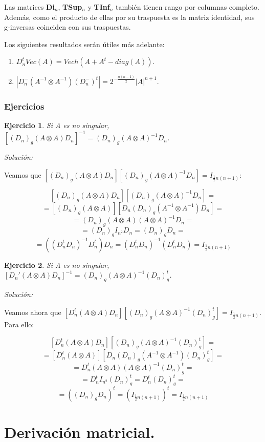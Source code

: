 \documentclass{article}
\theoremstyle{theorem-style}  %
\theoremstyle{definition-style}
\theoremstyle{example-style}
\theoremstyle{exercise-style}
\newtheorem{exercise}{Ejercicio}[section]
\begin{document}
	Las matrices \textbf{Di$_n$}, \textbf{TSup$_n$} y \textbf{TInf$_n$} también tienen rango por columnas completo. Además, como el producto de ellas por su traspuesta es la matriz identidad, sus g-inversas coinciden con sus traspuestas.
	
	Los siguientes resultados serán útiles más adelante:
	\begin{enumerate}
		\item $D_n^tVec(A) = Vech(A+A^t-diag(A))$.
		\item $|D_n^-(A^{-1}\otimes A^{-1})(D_n^-)^t| = 2^{-\frac{n(n-1)}{2}}|A|^{n+1}$.
	\end{enumerate}
	
	
	
	\subsubsection{Ejercicios}
	\begin{exercise}
		Si A es no singular, $[(D_n)_g(A\otimes A)D_n]^{-1} = (D_n)_g(A\otimes A)^{-1}D_n$.
	\end{exercise}
	
	\textit{Solución:}
	
	Veamos que $[(D_n)_g(A\otimes A)D_n][(D_n)_g(A\otimes A)^{-1}D_n] = I_{\frac{1}{2}n(n+1)}$:
	
	$$ [(D_n)_g(A\otimes A)D_n][(D_n)_g(A\otimes A)^{-1}D_n] = $$
	$$ = [(D_n)_g(A\otimes A)][D_n(D_n)_g(A^{-1}\otimes A^{-1})D_n] = $$
	$$ = (D_n)_g(A\otimes A)(A \otimes A)^{-1}D_n = $$
	$$ = (D_n)_g I_{n^2}D_n = (D_n)_g D_n = $$
	$$ = ((D_n^tD_n)^{-1}D_n^t )D_n =(D_n^tD_n)^{-1}(D_n^t D_n) = I_{\frac{1}{2}n(n+1)}$$ 
	
	\begin{exercise}
		Si A es no singular, $[D_n'(A\otimes A)D_n]^{-1} = (D_n)_g(A\otimes A)^{-1}(D_n)^t_g$.
	\end{exercise}
	
	\textit{Solución:}
	
	Veamos ahora que $[D_n^t(A\otimes A)D_n][(D_n)_g(A\otimes A)^{-1}(D_n)^t_g] = I_{\frac{1}{2}n(n+1)}$. Para ello:
	
	$$ [D_n^t(A\otimes A)D_n][(D_n)_g(A\otimes A)^{-1}(D_n)^t_g] = $$
	$$ = [D_n^t(A\otimes A)][D_n(D_n)_g(A^{-1}\otimes A^{-1})(D_n)^t_g]= $$
	$$ = D_n^t(A\otimes A)(A\otimes A)^{-1}(D_n)^t_g = $$
	$$ = D_n^t I_{n^2}(D_n)_g^t = D_n^t(D_n)_g^t = $$ 
	$$= ((D_n)_gD_n)^t = (I_{\frac{1}{2}n(n+1)})^t = I_{\frac{1}{2}n(n+1)}$$ 
	
	\newpage	
	\section{Derivación matricial.}
	
\end{document}

